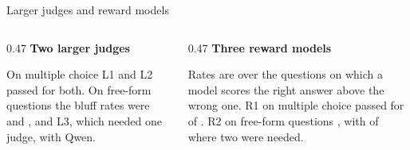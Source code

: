 \documentclass[14pt,aspectratio=169,t]{beamer}
\begin{document}
\begin{frame}{Larger judges and reward models}
\vspace{1mm}
\begin{columns}[T,onlytextwidth]
\begin{column}{0.47\textwidth}
\textbf{Two larger judges}\par
{\fontsize{10.5}{12.5}\selectfont{}\par}
\vspace{3mm}
\par
\vspace{2mm}
\par
\vspace{2mm}
\par
\vspace{3mm}
{\fontsize{10.5}{12.5}\selectfont On multiple choice L1 and L2 passed for both. On free-form questions the bluff rates were \lgFfBQwen{} and \lgFfBGLM{}, and L3, which needed one judge, \outcome{\lgLThreeOutcome{}} with Qwen.\par}
\end{column}
\hfill
\begin{column}{0.47\textwidth}
\textbf{Three reward models}\par
{\fontsize{10.5}{12.5}\selectfont{}\par}
\vspace{3mm}
\par
\vspace{2mm}
\par
\vspace{3mm}
{\fontsize{10.5}{12.5}\selectfont Rates are over the questions on which a model scores the right answer above the wrong one. R1 on multiple choice passed for \rmROnePass{} of \rmCount{}. R2 on free-form questions \outcome{\rmRTwoOutcome{}}, with \rmRTwoPass{} of \rmCount{} where two were needed.\par}
\end{column}
\end{columns}
\end{frame}
\end{document}

